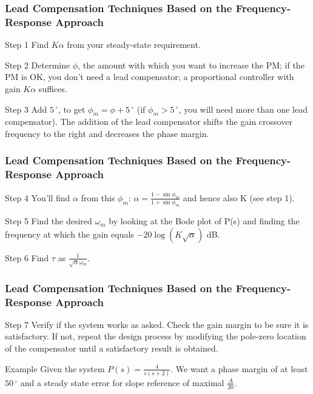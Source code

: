 \begin{frame}
	\frametitle{Lead Compensation Techniques Based on the Frequency-Response Approach}
	\begin{block}{Step 1}
	Find $K\alpha$ from your steady-state requirement.
	\end{block}
	\begin{block}{Step 2}
	Determine $\phi$, the amount with which you want to increase the PM; if the PM is OK, you don’t need a lead compensator; a proportional controller with gain $K\alpha$ suffices.
	\end{block}
	\begin{block}{Step 3}
	Add $5\,^{\circ}$, to get $\phi_m = \phi + 5\,^{\circ}$ (if $\phi_m > 5\,^{\circ}$, you will need more than one lead compensator). The addition of the lead compensator shifts the gain crossover frequency to the right and decreases the
	phase margin.
	\end{block}
\end{frame}

\begin{frame}
	\frametitle{Lead Compensation Techniques Based on the Frequency-Response Approach}
	\begin{block}{Step 4}
	You’ll find $\alpha$ from this $\phi_m$: $\alpha = \frac{1 - \sin \phi_m}{1 + \sin \phi_m}$ and hence also K (see step 1). 
	\end{block}
	\begin{block}{Step 5}
		Find the desired $\omega_m$ by looking at the Bode plot of P(s) and finding the frequency at which the gain equals $-20 \log (K\sqrt{\alpha})$ dB.
	\end{block}
	\begin{block}{Step 6}
	Find $\tau$ as $\frac{1}{\sqrt{\alpha}\omega_m}$.
	\end{block}
\end{frame}

\begin{frame}
	\frametitle{Lead Compensation Techniques Based on the Frequency-Response Approach}
	\begin{block}{Step 7}
		Verify if the system works as asked.
		Check the gain margin to be sure it is satisfactory. If not, repeat the design process
		by modifying the pole-zero location of the compensator until a satisfactory result
		is obtained.
	\end{block}
	\begin{block}{Example}
	Given the system $P(s) = \frac{4}{s(s+2)}$. We want a phase margin of at least $50\,^{\circ}$ and a steady state error for slope reference of maximal $\frac{A}{20}$.
	\end{block}
\end{frame}

